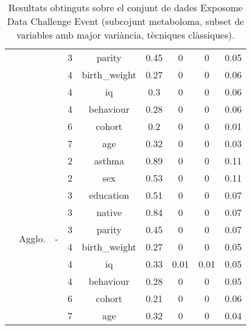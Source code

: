 \documentclass[CAT,BIB]{TFUOC}%
\begin{document}
\begin{table}[p]
\begin{tabular}{@{}ccccccccc@{}}
            &  &  & 3 & parity & 0.45 & 0 & 0 & 0.05 \\
            &  &  & 4 & birth\_weight & 0.27 & 0 & 0 & 0.06 \\
            &  &  & 4 & iq & 0.3 & 0 & 0 & 0.06 \\
            &  &  & 4 & behaviour & 0.28 & 0 & 0 & 0.06 \\
            &  &  & 6 & cohort & 0.2 & 0 & 0 & 0.01 \\
            &  &  & 7 & age & 0.32 & 0 & 0 & 0.03 \\ \cmidrule(l){2-9}
            & \multirow{10}{*}{Agglo.} & \multirow{10}{*}{-} & 2 & asthma & 0.89 & 0 & 0 & 0.11 \\
            &  &  & 2 & sex & 0.53 & 0 & 0 & 0.11 \\
            &  &  & 3 & education & 0.51 & 0 & 0 & 0.07 \\
            &  &  & 3 & native & 0.84 & 0 & 0 & 0.07 \\
            &  &  & 3 & parity & 0.45 & 0 & 0 & 0.07 \\
            &  &  & 4 & birth\_weight & 0.27 & 0 & 0 & 0.05 \\
            &  &  & 4 & iq & 0.33 & 0.01 & 0.01 & 0.05 \\
            &  &  & 4 & behaviour & 0.28 & 0 & 0 & 0.05 \\
            &  &  & 6 & cohort & 0.21 & 0 & 0 & 0.06 \\
            &  &  & 7 & age & 0.32 & 0 & 0 & 0.04 \\ \bottomrule
        \end{tabular}
        \caption[Exposome Data Challenge Event: resultats - part 3]{
            Resultats obtinguts sobre el conjunt de dades Exposome Data Challenge Event
            (subcojunt metaboloma, subset de variables amb major variància, tècniques clàssiques).
        }
        \label{t:results_exposome3}
    \end{table}
\end{document}

